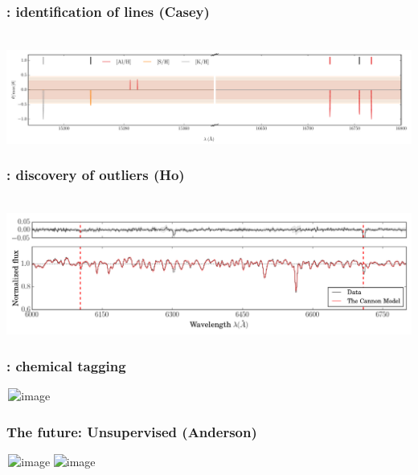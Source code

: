 \documentclass[pdftex]{beamer}
\begin{document}
\begin{frame}
  \frametitle{\tc: identification of lines (Casey)}
  \,\hfill\includegraphics[width=\figurewidth]{sparse-first-order-coefficients.pdf}%
\end{frame}

\begin{frame}
  \frametitle{\tc: discovery of outliers (Ho)}
  \,\hfill\includegraphics[width=\figurewidth]{resid_376.png}%
\end{frame}

\begin{frame}
  \frametitle{\tc: chemical tagging}
  \,\hfill\includegraphics<1>[height=\figureheight]{Sag.png}
\end{frame}

\begin{frame}
  \frametitle{The future: Unsupervised (Anderson)}
  \,\hfill\includegraphics<1>[height=\figureheight]{priorLMA.png}%
          \includegraphics<2>[height=\figureheight]{distancesM67.png}%
\end{frame}
\end{document}
